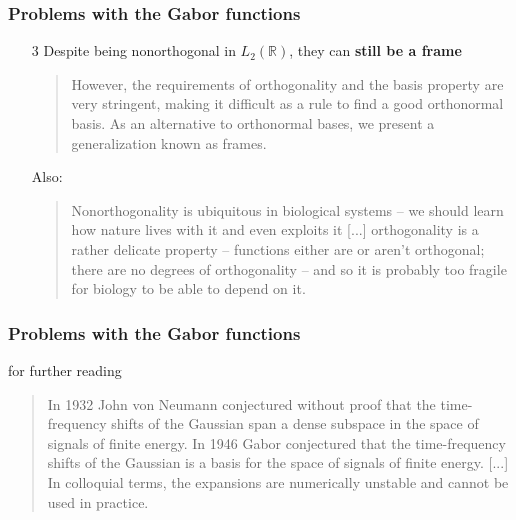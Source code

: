 \documentclass{beamer}
\begin{document}
\begin{frame}
	\frametitle{Problems with the Gabor functions}
	\begin{enumerate}
		\item[3]
			Despite being nonorthogonal in $L_{2}(\mathbb{R})$, they can \textbf{still be a frame}
			\begin{quote}
			However, the requirements of orthogonality and the basis property are very stringent, making it difficult as a rule to find a good orthonormal basis. As an alternative to orthonormal bases, we present a generalization known as frames. 
			\end{quote}
			Also:
			\begin{quote}
				Nonorthogonality is ubiquitous in biological systems -- we should learn how nature lives with it and even exploits it [...] orthogonality is a rather delicate property -- functions either are or aren't orthogonal; there are no degrees of orthogonality -- and so it is probably too fragile for biology to be able to depend on it.
			\end{quote}
	\end{enumerate}
\end{frame}

\begin{frame}
	\frametitle{Problems with the Gabor functions}
	\cite{gaborwrong} for further reading
	\begin{quote}
		In 1932 John von Neumann conjectured without proof that the time-frequency shifts of the Gaussian span a dense subspace in the space of signals of finite energy. In 1946 Gabor conjectured that the time-frequency shifts of the Gaussian is a basis for the space of signals of finite energy. [...] In colloquial terms, the expansions are numerically unstable and cannot be used in practice.
	\end{quote}
\end{frame}
\end{document}
